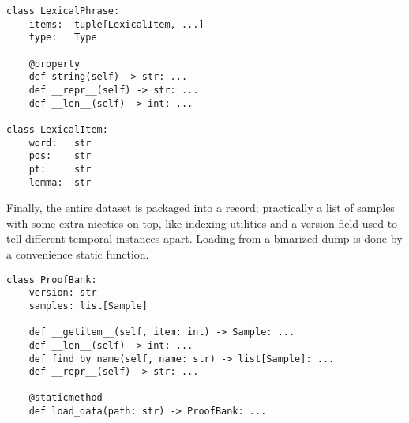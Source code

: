 \begin{verbatim}
class LexicalPhrase:
    items:  tuple[LexicalItem, ...]
    type:   Type

    @property
    def string(self) -> str: ...
    def __repr__(self) -> str: ...
    def __len__(self) -> int: ...

class LexicalItem:
    word:   str
    pos:    str
    pt:     str
    lemma:  str
\end{verbatim}

\noindent Finally, the entire dataset is packaged into a  record; practically a list of samples with some extra niceties on top, like indexing utilities and a version field used to tell different temporal instances apart.
Loading from a binarized dump is done by a convenience static function.

\begin{verbatim}
class ProofBank:
    version: str
    samples: list[Sample]

    def __getitem__(self, item: int) -> Sample: ...
    def __len__(self) -> int: ...
    def find_by_name(self, name: str) -> list[Sample]: ...
    def __repr__(self) -> str: ...

    @staticmethod
    def load_data(path: str) -> ProofBank: ...
\end{verbatim}





